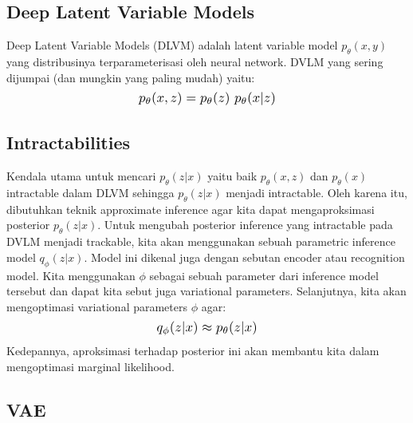 \documentclass{article}
\newcommand*{\Scale}[2][4]{\scalebox{#1}{\ensuremath{#2}}}
\begin{document}
\subsection{Deep Latent Variable Models}


Deep Latent Variable Models (DLVM) adalah latent variable model $ p_\theta(x,y) $ yang distribusinya terparameterisasi oleh neural network. 
DVLM yang sering dijumpai (dan mungkin yang paling mudah) yaitu:
\begin{equation}
\Scale[1.2]{ p_\theta(x,z) = p_\theta(z) \ p_\theta(x|z) }
\end{equation}


\subsection{Intractabilities}


Kendala utama untuk mencari $ p_\theta(z|x) $ yaitu baik $ p_\theta(x, z) $ dan $ p_\theta(x) $ intractable dalam DLVM sehingga $ p_\theta(z|x) $ menjadi intractable. Oleh karena itu, dibutuhkan teknik approximate inference agar kita dapat mengaproksimasi posterior $ p_\theta(z|x) $. Untuk mengubah posterior inference yang intractable pada DVLM menjadi trackable, kita akan menggunakan sebuah parametric inference model $ q_\phi(z|x) $. Model ini dikenal juga dengan sebutan encoder atau recognition model. Kita menggunakan $ \phi $ sebagai sebuah parameter dari inference model tersebut dan dapat kita sebut juga variational parameters. Selanjutnya, kita akan mengoptimasi variational parameters $ \phi $ agar:
\begin{equation}
\Scale[1.2]{ q_\phi(z|x) \approx p_\theta(z|x) }
\end{equation}
Kedepannya, aproksimasi terhadap posterior ini akan membantu kita dalam mengoptimasi marginal likelihood.


\subsection{VAE}
\end{document}
